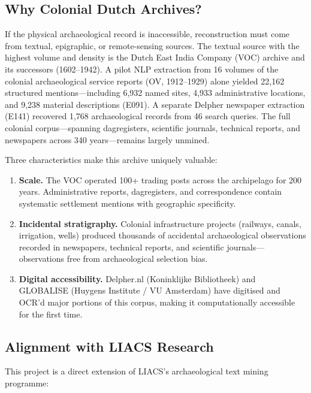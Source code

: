 \documentclass[11pt,a4paper]{article}
\begin{document}
\subsection{Why Colonial Dutch Archives?}

If the physical archaeological record is inaccessible, reconstruction must come from textual, epigraphic, or remote-sensing sources. The textual source with the highest volume and density is the Dutch East India Company (VOC) archive and its successors (1602--1942). A pilot NLP extraction from 16 volumes of the colonial archaeological service reports (OV, 1912--1929) alone yielded 22,162 structured mentions---including 6,932 named sites, 4,933 administrative locations, and 9,238 material descriptions (E091). A separate Delpher newspaper extraction (E141) recovered 1,768 archaeological records from 46 search queries. The full colonial corpus---spanning dagregisters, scientific journals, technical reports, and newspapers across 340 years---remains largely unmined.

Three characteristics make this archive uniquely valuable:
\begin{enumerate}[nosep]
  \item \textbf{Scale.} The VOC operated 100+ trading posts across the archipelago for 200 years. Administrative reports, dagregisters, and correspondence contain systematic settlement mentions with geographic specificity.
  \item \textbf{Incidental stratigraphy.} Colonial infrastructure projects (railways, canals, irrigation, wells) produced thousands of accidental archaeological observations recorded in newspapers, technical reports, and scientific journals---observations free from archaeological selection bias.
  \item \textbf{Digital accessibility.} Delpher.nl (Koninklijke Bibliotheek) and GLOBALISE (Huygens Institute / VU Amsterdam) have digitised and OCR'd major portions of this corpus, making it computationally accessible for the first time.
\end{enumerate}

\subsection{Alignment with LIACS Research}

This project is a direct extension of LIACS's archaeological text mining programme:
\end{document}
